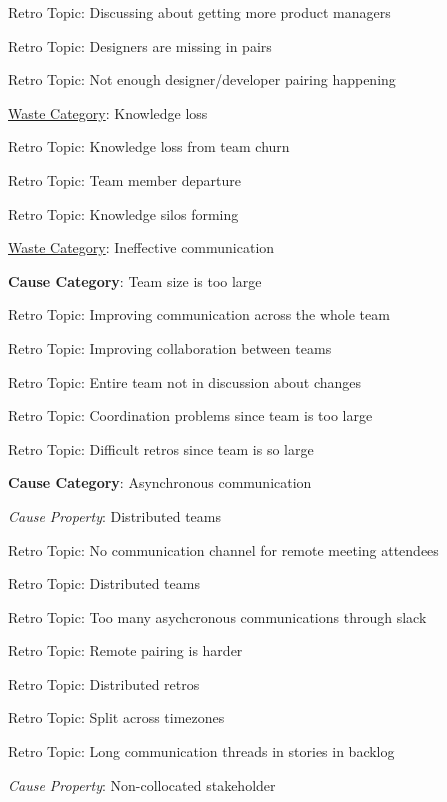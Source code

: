 \quad \quad \quad Retro Topic: Discussing about getting more product managers

\quad \quad \quad Retro Topic: Designers are missing in pairs

\quad \quad \quad Retro Topic: Not enough designer/developer pairing happening



\underline{Waste Category}: Knowledge loss

\quad \quad Retro Topic: Knowledge loss from team churn

\quad \quad Retro Topic: Team member departure

\quad \quad Retro Topic: Knowledge silos forming






\underline{Waste Category}: Ineffective communication

\quad \textbf{Cause Category}: Team size is too large

\quad \quad Retro Topic: Improving communication across the whole team

\quad \quad Retro Topic: Improving collaboration between teams

\quad \quad Retro Topic: Entire team not in discussion about changes

\quad \quad Retro Topic: Coordination problems since team is too large

\quad \quad Retro Topic: Difficult retros since team is so large

\quad \textbf{Cause Category}: Asynchronous communication

\quad \quad \textit{Cause Property}: Distributed teams

\quad \quad \quad Retro Topic: No communication channel for remote meeting attendees

\quad \quad \quad Retro Topic: Distributed teams

\quad \quad \quad Retro Topic: Too many asychcronous communications through slack

\quad \quad \quad Retro Topic: Remote pairing is harder

\quad \quad \quad Retro Topic: Distributed retros

\quad \quad \quad Retro Topic: Split across timezones

\quad \quad \quad Retro Topic: Long communication threads in stories in backlog

\quad \quad \textit{Cause Property}: Non-collocated stakeholder

